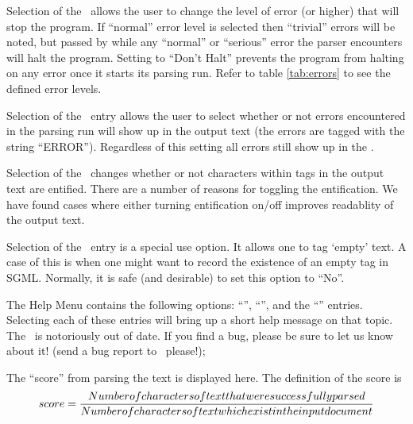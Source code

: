 Selection of the \haltparseronerrorleveloption\ allows the user to change
the level of error (or higher) that will stop the program. If ``normal''
error level is selected then ``trivial'' errors will be noted, but passed by
while any ``normal'' or ``serious'' error the parser encounters will halt the program. 
Setting to ``Don't Halt'' prevents the program from halting on any error 
once it starts its parsing run. 
Refer to table \ref{tab:errors} to see the defined error levels. 

Selection of the \taggederrorsinoutputxmltextoption\ entry allows the user
to select whether or not errors encountered in the parsing run will show
up in the output text (the errors are tagged with the string ``ERROR'').
Regardless of this setting all errors still show up in the \errortextarea . 

Selection of the \entifycharsinoutputxmloption\ changes whether or not 
characters within tags in the output text are entified.  
There are a number of reasons for toggling the entification. We have 
found cases where either turning entification on/off improves readablity 
of the output text.

Selection of the \allownullmatchesinoutputxmltextoption\ entry is a 
special use option. It allows one to tag `empty' text. A case of this 
is when one might want to record the existence of an empty tag in SGML.
Normally, it is safe (and desirable) to set this option to ``No''. 


The Help Menu contains the following options:
``\abouthelpoption'', ``\parsinghelpoption'',
and the ``\knownbugsoption'' entries.
Selecting each of these entries will bring up a short help message on that
topic. The \knownbugsoption\ is notoriously out of date.
If you find a bug, please be sure to let us know about it! (send a bug
report to \bugmail\ please!);


The ``score'' from parsing the text is displayed here. The definition 
of the score is 
\begin{equation}
score = \frac{Number of characters of text that were successfully parsed}{Number of characters of text which exist in the input document}
\index{parser, score definition}
\end{equation}

\subsubsection{\errortextarea }

